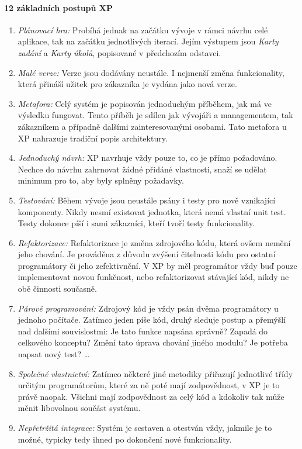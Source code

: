 \paragraph{12 základních postupů XP} \label{methods:XP:12}
\begin{enumerate}
	\item \emph{Plánovací hra:} Probíhá jednak na začátku vývoje v rámci návrhu celé aplikace, tak na začátku jednotlivých iterací. Jejím výstupem jsou \emph{Karty zadání} a \emph{Karty úkolů}, popisované v předchozím odstavci.
	\item \emph{Malé verze:} Verze jsou dodávány neustále. I nejmenší změna funkcionality, která přináší užitek pro zákazníka je vydána jako nová verze.
	\item \emph{Metafora:} Celý systém je popisován jednoduchým příběhem, jak má ve výsledku fungovat. Tento příběh je sdílen jak vývojáři a managementem, tak zákazníkem a případně dalšími zainteresovanými osobami. Tato metafora u XP nahrazuje tradiční popis architektury.
	\item \emph{Jednoduchý návrh:} XP navrhuje vždy pouze to, co je přímo požadováno. Nechce do návrhu zahrnovat žádné přidáné vlastnosti, snaží se udělat minimum pro to, aby byly splněny požadavky.
	\item \emph{Testování:} Během vývoje jsou neustále psány i testy pro nově vznikající komponenty. Nikdy nesmí existovat jednotka, která nemá vlastní unit test. Testy dokonce píší i sami zákazníci, kteří tvoří testy funkcionality.
	\item \emph{Refaktorizace:} Refaktorizace je změna zdrojového kódu, která ovšem nemění jeho chování. Je prováděna z důvodu zvýšení čitelnosti kódu pro ostatní programátory či jeho zefektivnění. V XP by měl programátor vždy buď pouze implementovat novou funkčnost, nebo refaktorizovat stávající kód, nikdy ne obě činnosti současně.
	\item \emph{Párové programování:} Zdrojový kód je vždy psán dvěma programátory u jednoho počítače. Zatímco jeden píše kód, druhý sleduje postup a přemýšlí nad dalšími souvislostmi: Je tato funkce napsána správně? Zapadá do celkového konceptu? Změní tato úprava chování jiného modulu? Je potřeba napsat nový test? \ldots
	\item \emph{Společné vlastnictví:} Zatímco některé jiné metodiky přiřazují jednotlivé třídy určitým programátorům, které za ně poté mají zodpovědnost, v XP je to právě naopak. Všichni mají zodpovědnost za celý kód a kdokoliv tak může měnit libovolnou součást systému.
	\item \emph{Nepřetržitá integrace:} Systém je sestaven a otestván vždy, jakmile je to možné, typicky tedy ihned po dokončení nové funkcionality.

\end{enumerate}
